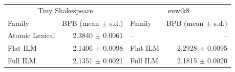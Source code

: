 \begin{tabular}{lr|lr}
\toprule
\multicolumn{2}{c|}{Tiny Shakespeare} & \multicolumn{2}{c}{enwik8} \\
Family & BPB (mean $\pm$ s.d.) & Family & BPB (mean $\pm$ s.d.) \\
\midrule
Atomic Lexical & 2.3840 $\pm$ 0.0061 & -- & -- \\
Flat ILM & 2.1406 $\pm$ 0.0098 & Flat ILM & 2.2928 $\pm$ 0.0095 \\
Full ILM & 2.1351 $\pm$ 0.0021 & Full ILM & 2.1815 $\pm$ 0.0020 \\
\bottomrule
\end{tabular}
